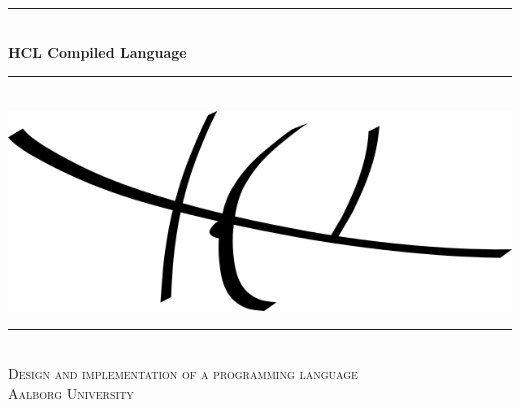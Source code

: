 
\begin{titlingpage}

  \centering
  \rule{\linewidth}{0.2 mm} \\[0.5 cm]
  { \huge \bfseries HCL Compiled Language}\\
  \rule{\linewidth}{0.2 mm} \\[2 cm]
  \includegraphics[scale=0.70]{images/hclLogo.png}\\[2 cm]
  \rule{\linewidth}{0.2 mm} \\[0.3 cm]
  \textsc{\LARGE Design and implementation of a programming language} \\[0.5 cm]
  \textsc{\large Aalborg University}\\[0.5 cm]
  {\Large \groupnumber}\\[0.5 cm]

\end{titlingpage}